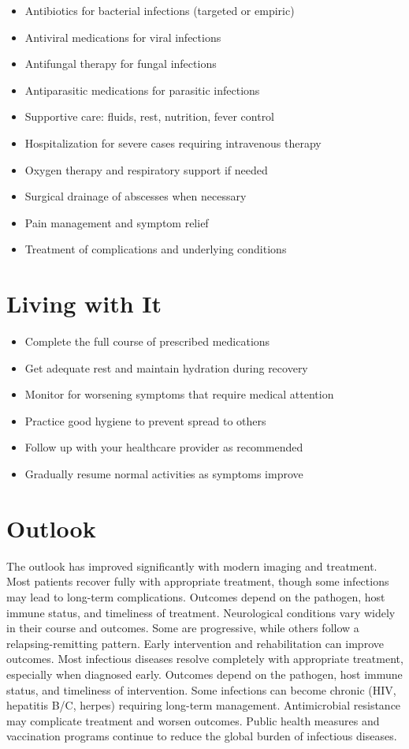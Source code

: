 \begin{itemize}[noitemsep]
  \item Antibiotics for bacterial infections (targeted or empiric)
  \item Antiviral medications for viral infections
  \item Antifungal therapy for fungal infections
  \item Antiparasitic medications for parasitic infections
  \item Supportive care: fluids, rest, nutrition, fever control
  \item Hospitalization for severe cases requiring intravenous therapy
  \item Oxygen therapy and respiratory support if needed
  \item Surgical drainage of abscesses when necessary
  \item Pain management and symptom relief
  \item Treatment of complications and underlying conditions
\end{itemize}
\section{Living with It}
\begin{itemize}[noitemsep]
  \item Complete the full course of prescribed medications
  \item Get adequate rest and maintain hydration during recovery
  \item Monitor for worsening symptoms that require medical attention
  \item Practice good hygiene to prevent spread to others
  \item Follow up with your healthcare provider as recommended
  \item Gradually resume normal activities as symptoms improve
\end{itemize}
\section{Outlook}
The outlook has improved significantly with modern imaging and treatment. Most patients recover fully with appropriate treatment, though some infections may lead to long-term complications. Outcomes depend on the pathogen, host immune status, and timeliness of treatment. Neurological conditions vary widely in their course and outcomes. Some are progressive, while others follow a relapsing-remitting pattern. Early intervention and rehabilitation can improve outcomes. Most infectious diseases resolve completely with appropriate treatment, especially when diagnosed early. Outcomes depend on the pathogen, host immune status, and timeliness of intervention. Some infections can become chronic (HIV, hepatitis B/C, herpes) requiring long-term management. Antimicrobial resistance may complicate treatment and worsen outcomes. Public health measures and vaccination programs continue to reduce the global burden of infectious diseases.
